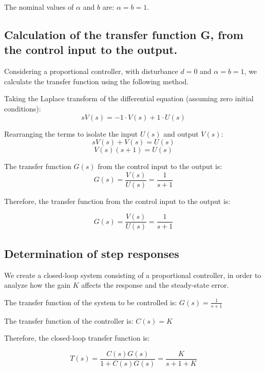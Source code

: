 \documentclass[conference]{IEEEtran}
\begin{document}
The nominal values of $\alpha$ and $b$ are: $\alpha=b=1$.

\subsection{Calculation of the transfer function G, from the control input to the output.}
Considering a proportional controller, with disturbance $d=0$ and $\alpha=b=1$, we calculate the transfer function using the following method.

Taking the Laplace transform of the differential equation (assuming zero initial conditions):
\begin{equation}
    sV(s) = -1 \cdot V(s) + 1 \cdot U(s)
\end{equation}

Rearranging the terms to isolate the input $U(s)$ and output $V(s)$:
\begin{equation}
    sV(s) + V(s) = U(s)
\end{equation}
\begin{equation}
    V(s)(s + 1) = U(s)
\end{equation}

The transfer function $G(s)$ from the control input to the output is:
\begin{equation}
    G(s) = \frac{V(s)}{U(s)} = \frac{1}{s + 1}
\end{equation}

Therefore, the transfer function from the control input to the output is:

\begin{equation}
    G(s) = \frac{V(s)}{U(s)} = \frac{1}{s+1}
\end{equation}

\subsection{Determination of step responses}
We create a closed-loop system consisting of a proportional controller, in order to analyze how the gain $K$ affects the response and the steady-state error.

The transfer function of the system to be controlled is: $G(s) = \frac{1}{s+1}$

The transfer function of the controller is: $C(s) = K$

Therefore, the closed-loop transfer function is:

\begin{equation}
    T(s) = \frac{C(s)G(s)}{1 + C(s)G(s)} = \frac{K}{s + 1 + K}
\end{equation}
\end{document}

